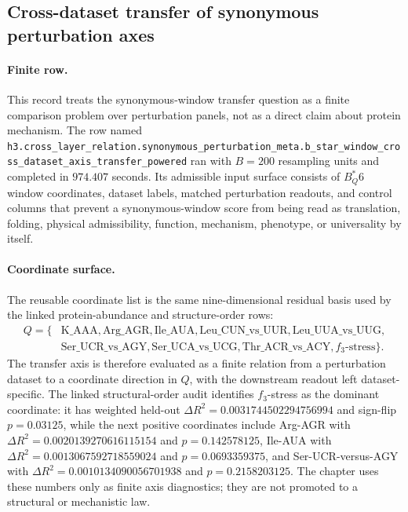 \subsection{Cross-dataset transfer of synonymous perturbation axes}\label{subsec:bioreality-cross-dataset-synonymous-axis-transfer}

\paragraph{Finite row.}
This record treats the synonymous-window transfer question as a finite comparison problem over perturbation panels, not as a direct claim about protein mechanism.  The row named \texttt{h3.cross\_layer\_relation.synonymous\_perturbation\_meta.b\_star\_window\_cross\_dataset\_axis\_transfer\_powered} ran with $B=200$ resampling units and completed in $974.407$ seconds.  Its admissible input surface consists of $B^*_Q6$ window coordinates, dataset labels, matched perturbation readouts, and control columns that prevent a synonymous-window score from being read as translation, folding, physical admissibility, function, mechanism, phenotype, or universality by itself.

\paragraph{Coordinate surface.}
The reusable coordinate list is the same nine-dimensional residual basis used by the linked protein-abundance and structure-order rows:
$$
\begin{aligned}
Q=\{&\mathrm{K\_AAA},\mathrm{Arg\_AGR},\mathrm{Ile\_AUA},\mathrm{Leu\_CUN\_vs\_UUR},\mathrm{Leu\_UUA\_vs\_UUG},\\
&\mathrm{Ser\_UCR\_vs\_AGY},\mathrm{Ser\_UCA\_vs\_UCG},\mathrm{Thr\_ACR\_vs\_ACY},f_3\text{-}\mathrm{stress}\}.
\end{aligned}
$$
The transfer axis is therefore evaluated as a finite relation from a perturbation dataset to a coordinate direction in $Q$, with the downstream readout left dataset-specific.  The linked structural-order audit identifies $f_3$-stress as the dominant coordinate: it has weighted held-out $\Delta R^2=0.0031744502294756994$ and sign-flip $p=0.03125$, while the next positive coordinates include Arg-AGR with $\Delta R^2=0.0020139270616115154$ and $p=0.142578125$, Ile-AUA with $\Delta R^2=0.0013067592718559024$ and $p=0.0693359375$, and Ser-UCR-versus-AGY with $\Delta R^2=0.0010134090056701938$ and $p=0.2158203125$.  The chapter uses these numbers only as finite axis diagnostics; they are not promoted to a structural or mechanistic law.

